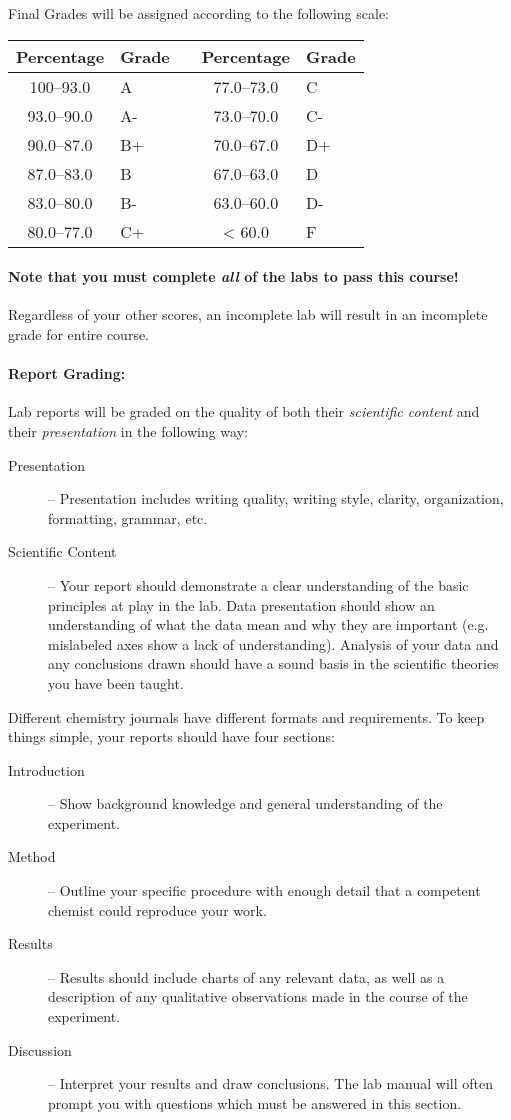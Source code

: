 \documentclass[12pt, letterpaper]{article}
\begin{document}
\noindent Final Grades will be assigned according to the following scale:

\begin{tabular}{cl|c|cl}
	Percentage & Grade &  & Percentage & Grade \\ \midrule
	100--93.0  & A     &  & 77.0--73.0 & C     \\
	93.0--90.0 & A-    &  & 73.0--70.0 & C-    \\
	90.0--87.0 & B+    &  & 70.0--67.0 & D+    \\
	87.0--83.0 & B     &  & 67.0--63.0 & D     \\
	83.0--80.0 & B-    &  & 63.0--60.0 & D-    \\
	80.0--77.0 & C+    &  & < 60.0     & F
\end{tabular}

\paragraph{Note that you must complete \emph{all} of the labs to pass this course!} Regardless of your other scores, an incomplete lab will result in an incomplete grade for entire course.

\paragraph{Report Grading:}
Lab reports will be graded on the quality of both their \emph{scientific content} and their \emph{presentation} in the following way:
\begin{description}
	\item[Presentation] -- Presentation includes writing quality, writing style, clarity, organization, formatting, grammar, etc.

	\item[Scientific Content] -- Your report should demonstrate a clear understanding of the basic principles at play in the lab. Data presentation should show an understanding of what the data mean and why they  are important (e.g. mislabeled axes show a lack of understanding). Analysis of your data and any conclusions drawn should have a sound basis in the scientific theories you have been taught.
\end{description}

Different chemistry journals have different formats and requirements. To keep things simple, your reports should have four sections:
\begin{description}
	\item[Introduction] -- Show background knowledge and general understanding of the experiment.
	\item[Method] -- Outline your specific procedure with enough detail that a competent chemist could reproduce your work.
	\item[Results] -- Results should include charts of any relevant data, as well as a description of any qualitative observations made in the course of the experiment.
	\item[Discussion] -- Interpret your results and draw conclusions. The lab manual will often prompt you with questions which must be answered in this section.
\end{description}
\end{document}
